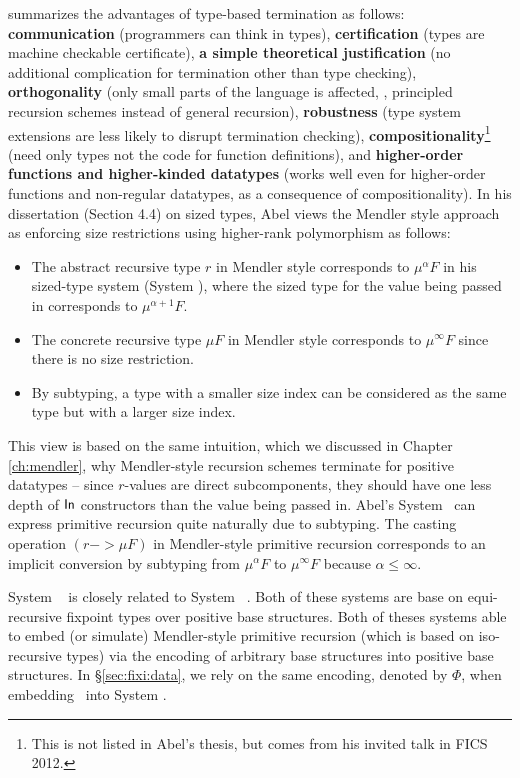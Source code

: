 \citet{abel06phd,Abel12talkFICS} summarizes the advantages of
type-based termination as follows:
\textbf{communication} (programmers can think in types),
\textbf{certification} (types are machine checkable certificate),
\textbf{a simple theoretical justification}
	(no additional complication for termination other than type checking),
\textbf{orthogonality} (only small parts of the language is affected,
	\eg, principled recursion schemes instead of general recursion),
\textbf{robustness} (type system extensions are less likely to
			disrupt termination checking),
\textbf{compositionality}\footnote{This is not listed in Abel's thesis,
				but comes from his invited talk in FICS 2012.}
	(need only types not the code for function definitions), and
\textbf{higher-order functions and higher-kinded datatypes}
	(works well even for higher-order functions and non-regular datatypes,
	as a consequence of compositionality).
In his dissertation \cite{abel06phd} (Section 4.4) on sized types,
Abel views the Mendler style approach as enforcing size restrictions
using higher-rank polymorphism as follows:
\begin{itemize}
\item The abstract recursive type $r$ in Mendler style corresponds to
	$\mu^\alpha F$ in his sized-type system (System \Fwhat),
	where the sized type
	for the value being passed in corresponds to $\mu^{\alpha+1} F$.
\item The concrete recursive type $\mu F$ in Mendler style corresponds to
	$\mu^\infty F$ since there is no size restriction.
\item By subtyping, a type with a smaller size index can be considered as
	the same type but with a larger size index.
\end{itemize}
This view is based on the same intuition, which we discussed in
Chapter \ref{ch:mendler}, why Mendler-style recursion schemes terminate for
positive datatypes -- since $r$-values are direct subcomponents, they should
have one less depth of $\mathsf{In}$ constructors than the value being passed in.
Abel's System \Fwhat\ can express primitive recursion quite naturally
due to subtyping. The casting operation $(r -> \mu F)$ in Mendler-style
primitive recursion corresponds to an implicit conversion by subtyping
from $\mu^\alpha F$ to $\mu^\infty F$ because $\alpha \leq \infty$.

System \Fwhat\ \cite{abel06phd} is closely related to
System \Fixw\ \cite{AbeMat04}. Both of these systems are base on
equi-recursive fixpoint types over positive base structures.
Both of theses systems able to embed (or simulate) Mendler-style
primitive recursion (which is based on iso-recursive types) via
the encoding \cite{Geu92} of arbitrary base structures into
positive base structures. In \S\ref{sec:fixi:data}, we rely on
the same encoding, denoted by $\Phi$, when embedding \MPr\ into System \Fixi.

